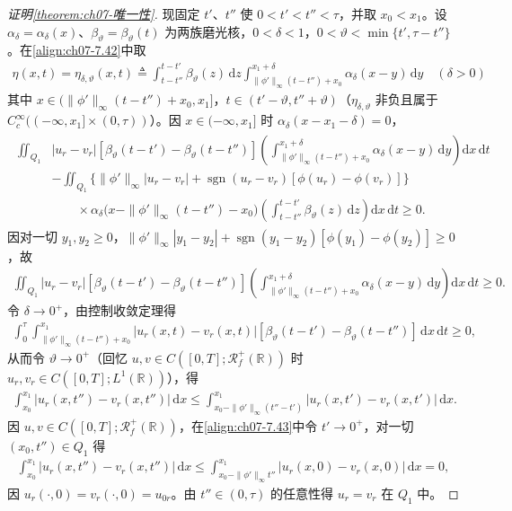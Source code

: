 \documentclass[../../main.tex]{subfiles}%
\begin{document}
\begin{proof}[证明\cref{theorem:ch07-唯一性}]
现固定 $t'$、$t''$ 使 $0<t'<t''<\tau$，并取 $x_0<x_1$。设 $\alpha_\delta=\alpha_\delta(x)$、$\beta_\vartheta=\beta_\vartheta(t)$ 为两族磨光核，$0<\delta<1$，$0<\vartheta<\min\{t',\tau-t''\}$。在\eqref{align:ch07-7.42}中取
\begin{align*}
\eta(x,t)=\eta_{\delta,\vartheta}(x,t)\triangleq\int_{t-t''}^{t-t'}\beta_\vartheta(z)\,\mathrm{d}z\int_{\|\phi'\|_\infty(t-t'')+x_0}^{x_1+\delta}\alpha_\delta(x-y)\,\mathrm{d}y\quad(\delta>0)
\end{align*}
其中 $x\in(\|\phi'\|_\infty(t-t'')+x_0,x_1]$，$t\in(t'-\vartheta,t''+\vartheta)$（$\eta_{\delta,\vartheta}$ 非负且属于 $C^\infty_c((-\infty,x_1]\times(0,\tau))$）。因 $x\in(-\infty,x_1]$ 时 $\alpha_\delta(x-x_1-\delta)=0$，
\begin{align*}
\begin{aligned}
\iint_{Q_1}&|u_r-v_r|[\beta_\vartheta(t-t')-\beta_\vartheta(t-t'')]\left(\int_{\|\phi'\|_\infty(t-t'')+x_0}^{x_1+\delta}\alpha_\delta(x-y)\,\mathrm{d}y\right)\mathrm{d}x\,\mathrm{d}t\\
&-\iint_{Q_1}\{\|\phi'\|_\infty|u_r-v_r|+\operatorname{sgn}(u_r-v_r)[\phi(u_r)-\phi(v_r)]\}\\
&\qquad\times\alpha_\delta\bigl(x-\|\phi'\|_\infty(t-t'')-x_0\bigr)\left(\int_{t-t''}^{t-t'}\beta_\vartheta(z)\,\mathrm{d}z\right)\mathrm{d}x\,\mathrm{d}t\geqslant0.
\end{aligned}
\end{align*}
因对一切 $y_1,y_2\geqslant0$，$\|\phi'\|_\infty|y_1-y_2|+\operatorname{sgn}(y_1-y_2)[\phi(y_1)-\phi(y_2)]\geqslant0$，故
\begin{align*}
\iint_{Q_1}|u_r-v_r|[\beta_\vartheta(t-t')-\beta_\vartheta(t-t'')]\left(\int_{\|\phi'\|_\infty(t-t'')+x_0}^{x_1+\delta}\alpha_\delta(x-y)\,\mathrm{d}y\right)\mathrm{d}x\,\mathrm{d}t\geqslant0.
\end{align*}
令 $\delta\to0^+$，由控制收敛定理得
\begin{align*}
\int_0^\tau\int_{\|\phi'\|_\infty(t-t'')+x_0}^{x_1}|u_r(x,t)-v_r(x,t)|[\beta_\vartheta(t-t')-\beta_\vartheta(t-t'')]\,\mathrm{d}x\,\mathrm{d}t\geqslant0,
\end{align*}
从而令 $\vartheta\to0^+$（回忆 $u,v\in C([0,T];\mathscr{R}_f^+(\mathbb{R}))$ 时 $u_r,v_r\in C([0,T];L^1(\mathbb{R}))$），得
\begin{align}
\int_{x_0}^{x_1}|u_r(x,t'')-v_r(x,t'')|\,\mathrm{d}x
\leqslant\int_{x_0-\|\phi'\|_\infty(t''-t')}^{x_1}|u_r(x,t')-v_r(x,t')|\,\mathrm{d}x. \label{align:ch07-7.43}
\end{align}
因 $u,v\in C([0,T];\mathscr{R}_f^+(\mathbb{R}))$，在\eqref{align:ch07-7.43}中令 $t'\to0^+$，对一切 $(x_0,t'')\in Q_1$ 得
\begin{align*}
\int_{x_0}^{x_1}|u_r(x,t'')-v_r(x,t'')|\,\mathrm{d}x
\leqslant\int_{x_0-\|\phi'\|_\infty t''}^{x_1}|u_r(x,0)-v_r(x,0)|\,\mathrm{d}x=0,
\end{align*}
因 $u_r(\cdot,0)=v_r(\cdot,0)=u_{0r}$。由 $t''\in(0,\tau)$ 的任意性得 $u_r=v_r$ 在 $Q_1$ 中。
\end{proof}
\end{document}

